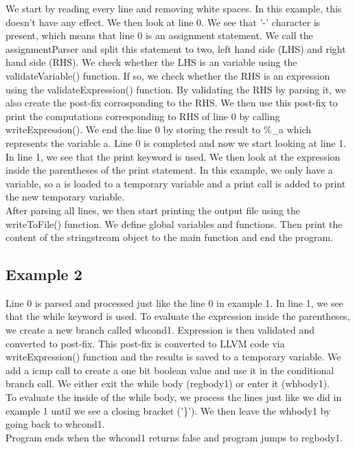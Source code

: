 \documentclass[12pt,a4paper]{article}
\begin{document}
We start by reading every line and removing white spaces. In this example, this doesn't have any effect. We then look at line 0. We see that '-' character is present, which means that line 0 is an assignment statement. We call the assignmentParser and split this statement to two, left hand side (LHS) and right hand side (RHS). We check whether the LHS is an variable using the validateVariable() function. If so, we check whether the RHS is an expression using the validateExpression() function. By validating the RHS by parsing it, we also create the post-fix corrosponding to the RHS. We then use this post-fix to print the computations corresponding to RHS of line 0 by calling writeExpression(). We end the line 0 by storing the result to \%\_a which represents the variable a. Line 0 is completed and now we start looking at line 1. \\
In line 1, we see that the print keyword is used. We then look at the expression inside the parentheses of the print statement. In this example, we only have a variable, so a is loaded to a temporary variable and a print call is added to print the new temporary variable. \\
After parsing all lines, we then start printing the output file using the writeToFile() function. We define global variables and functions. Then print the content of the stringstream object to the main function and end the program. \\

\subsection{Example 2}


Line 0 is parsed and processed just like the line 0 in example 1. In line 1, we see that the while keyword is used. To evaluate the expression inside the parentheses, we create a new branch called whcond1. Expression is then validated and converted to post-fix. This post-fix is converted to LLVM code via writeExpression() function and the results is saved to a temporary variable. We add a icmp call to create a one bit boolean value and use it in the conditional branch call. We either exit the while body (regbody1) or enter it (whbody1). \\
To evaluate the inside of the while body, we process the lines just like we did in example 1 until we see a closing bracket ('\}'). We then leave the whbody1 by going back to whcond1. \\
Program ends when the whcond1 returns false and program jumps to regbody1.\\
\end{document}
